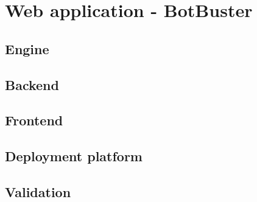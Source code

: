 \chapter{Web application - BotBuster}
\label{capitolo6}
\thispagestyle{empty}

\section{Engine}
\section{Backend}
\section{Frontend}
\section{Deployment platform}
\section{Validation}
